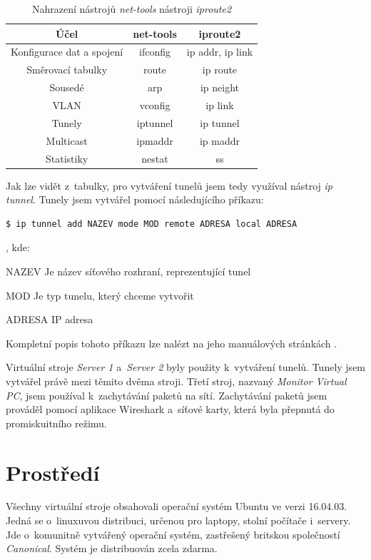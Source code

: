 \begin{table}[H]
    \centering
    \begin{tabular}{| c | c | c |}
        \hline
         \textbf{Účel} & \textbf{net-tools} & \textbf{iproute2}  \\
         \hline
         Konfigurace dat a spojení & ifconfig & ip addr, ip link \\
         \hline
         Směrovací tabulky & route & ip route \\
         \hline
         Sousedé & arp & ip neight \\
         \hline
         VLAN & vconfig & ip link \\
         \hline
         Tunely & iptunnel & ip tunnel \\
         \hline
         Multicast & ipmaddr & ip maddr \\
         \hline
         Statistiky & nestat & ss \\
         \hline
    \end{tabular}
    \caption{Nahrazení nástrojů \emph{net-tools} nástroji \emph{iproute2}}
    \label{tab:iproute2}
\end{table}

Jak lze vidět z~tabulky, pro vytváření tunelů jsem tedy využíval nástroj \emph{ip tunnel}. Tunely jsem vytvářel pomocí následujícího příkazu:

\begin{lstlisting}[language=bash]
    $ ip tunnel add NAZEV mode MOD remote ADRESA local ADRESA
\end{lstlisting}
, kde:

\begin{DESCRIPTION}
    \item[NAZEV] Je název síťového rozhraní, reprezentující tunel
    \item[MOD] Je typ tunelu, který chceme vytvořit
    \item[ADRESA] IP adresa
\end{DESCRIPTION}
Kompletní popis tohoto příkazu lze nalézt na jeho manuálových stránkách \cite{iptunnel}.

Virtuální stroje \emph{Server 1} a~\emph{Server 2} byly použity k~vytváření tunelů. Tunely jsem vytvářel právě mezi těmito dvěma stroji. Třetí stroj, nazvaný \emph{Monitor Virtual PC}, jsem používal k~zachytávání paketů na sítí. Zachytávání paketů jsem prováděl pomocí aplikace Wireshark a~síťové karty, která byla přepnutá do promiskuitního režimu.

\section{Prostředí}
\label{sec:prostredi}
Všechny virtuální stroje obsahovali operační systém Ubuntu ve verzi 16.04.03. Jedná se o~linuxuvou distribuci, určenou pro laptopy, stolní počítače i~servery. Jde o~komunitně vytvářený operační systém, zastřešený britskou společností \emph{Canonical}. Systém je distribuován zcela zdarma.

